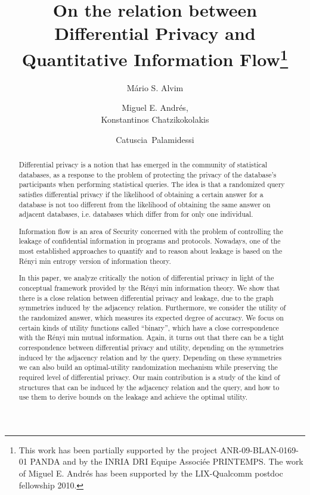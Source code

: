 \documentclass{llncs}
\begin{document}
\title{On the relation between Differential Privacy and Quantitative Information Flow\thanks{This work has been partially supported by the project ANR-09-BLAN-0169-01  PANDA  and by  the INRIA DRI  Equipe Associ\'ee PRINTEMPS. The work of Miguel E. Andr\'es has been supported by the LIX-Qualcomm  postdoc fellowship 2010.}
}
\author{ M\'ario S. Alvim  \and Miguel E. Andr\'es,  \\ Konstantinos Chatzikokolakis  \and Catuscia~Palamidessi }

\maketitle

\begin{abstract}

Differential privacy is a notion that has emerged in the community of statistical databases, as a response to the problem of protecting the privacy of the database's participants  when performing statistical queries. 
The idea is that a randomized query satisfies differential privacy if the likelihood of obtaining a certain answer for a database  is not too different from the likelihood of obtaining the same answer on adjacent databases, i.e. databases  which differ from  for only one individual. 

Information flow is an area of Security concerned with the problem of controlling the leakage of confidential information in programs and protocols. 
Nowadays, one of the most established approaches  to quantify and  to reason about leakage is based on the R\'enyi min entropy version of  information theory.  

In this paper, we analyze critically the notion of differential privacy in light of the conceptual framework provided by  the R\'enyi min  information theory.
We show that  there is a close relation between differential privacy and leakage, due to the graph symmetries induced by the adjacency relation. 
Furthermore, we consider  the utility of the randomized answer, which measures its expected  degree of accuracy. We  focus on certain kinds of utility functions called ``binary'', which have a 
close correspondence with the R\'enyi min mutual information. Again, it turns out that there can be a tight correspondence between differential privacy and utility, depending 
on the  symmetries induced by the adjacency relation and by the query. Depending on these symmetries we can also build an optimal-utility randomization mechanism while preserving the required level of differential privacy. Our main contribution is a study of the kind of structures that can be induced  by the adjacency relation and the query, and how to use them to derive bounds on the leakage and achieve the optimal utility. 
\end{abstract}
\end{document}
